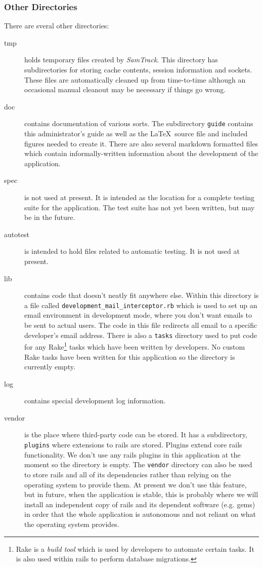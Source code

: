 \documentclass[12pt,twoside]{article}
\newcommand{\samtrack}{\emph{SamTrack}}
\begin{document}
\subsubsection{Other Directories}
There are sveral other directories:
\begin{description}
\item[tmp]
holds temporary files created by \samtrack.
This directory has subdirectories for storing
cache contents, session information and sockets. These files are automatically
cleaned up from time-to-time although an occasional manual cleanout may be
necessary if things go wrong.
\item[doc]
contains documentation of various sorts.
The subdirectory \verb=guide= contains this administrator's guide as well
as the \LaTeX\ source file and included figures needed to create it.
There are also several markdown formatted files which contain 
informally-written information about the development of the application.
\item[spec]
is not used at present. It is intended as the location for
a complete testing suite for the application. The test suite has not yet
been written, but may be in the future.
\item[autotest]
is intended to hold files related to automatic testing.
It is not used at present.
\item[lib]
contains code that doesn't neatly fit anywhere else.
Within this directory is a file called 
\verb=development_mail_interceptor.rb=
which is used to set up an email environment in development mode, where
you don't want emails to be sent to actual users. The code in this file
redirects all email to a specific developer's email address.
There is also a \verb=tasks= directory used to put code for any
Rake\footnote{Rake is a \emph{build tool} which is used by developers to
automate certain tasks. It is also used within rails to perform database 
migrations.} tasks which have been written by developers. No custom
Rake tasks have been written for this application so the directory is
currently empty.
\item[log]
contains special development log information.
\item[vendor]
is the place where third-party code can be stored. It has a subdirectory,
\verb=plugins= where extensions to rails are stored. Plugins
extend core rails functionality. We don't use any rails plugins in this
application at the moment so the directory is empty. The \verb=vendor=
directory can also be used to store rails and all of its dependencies
rather than relying on the operating system to provide them. At present
we don't use this feature, but in future, when the application is stable,
this is probably where we will install an independent copy of rails and
its dependent software (e.g. gems) in order that the whole application
is autonomous and not reliant on what the operating system provides.
\end{description}
\end{document}
